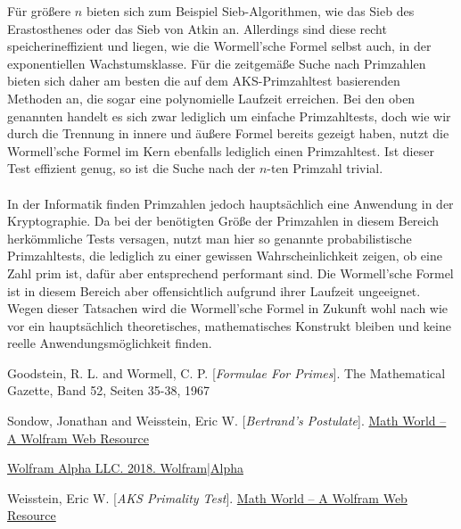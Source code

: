 \documentclass[11pt]{scrartcl}
\begin{document}
Für größere $n$ bieten sich zum Beispiel Sieb-Algorithmen, wie das Sieb des Erastosthenes oder das Sieb von Atkin an. Allerdings sind diese recht speicherineffizient und liegen, wie die Wormell'sche Formel selbst auch, in der exponentiellen Wachstumsklasse. Für die zeitgemäße Suche nach Primzahlen bieten sich daher am besten die auf dem AKS-Primzahltest\cite{AKS-Primzahltest} basierenden Methoden an, die sogar eine polynomielle Laufzeit erreichen. Bei den oben genannten handelt es sich zwar lediglich um einfache Primzahltests, doch wie wir durch die Trennung in innere und äußere Formel bereits gezeigt haben, nutzt die Wormell'sche Formel im Kern ebenfalls lediglich einen Primzahltest. Ist dieser Test effizient genug, so ist die Suche nach der $n$-ten Primzahl trivial.

\paragraph{}

In der Informatik finden Primzahlen jedoch hauptsächlich eine Anwendung in der Kryptographie. Da bei der benötigten Größe der Primzahlen in diesem Bereich herkömmliche Tests versagen, nutzt man hier so genannte probabilistische Primzahltests, die lediglich zu einer gewissen Wahrscheinlichkeit zeigen, ob eine Zahl prim ist, dafür aber entsprechend performant sind. Die Wormell'sche Formel ist in diesem Bereich aber offensichtlich aufgrund ihrer Laufzeit ungeeignet. Wegen dieser Tatsachen wird die Wormell'sche Formel in Zukunft wohl nach wie vor ein hauptsächlich theoretisches, mathematisches Konstrukt bleiben und keine reelle Anwendungsmöglichkeit finden.

\begin{thebibliography}{9}

Goodstein, R. L. and Wormell, C. P.
[\textit{Formulae For Primes}]. 
The Mathematical Gazette, Band 52, Seiten 35-38, 1967

Sondow, Jonathan and Weisstein, Eric W.
[\textit{Bertrand's Postulate}]. 
 \href{http://mathworld.wolfram.com/BertrandsPostulate.html}{Math World -- A Wolfram Web Resource}

\href{http://www.wolframalpha.com/input/?i=prime+1+to+100000}{Wolfram Alpha LLC. 2018. Wolfram|Alpha}

Weisstein, Eric W.
[\textit{AKS Primality Test}]. 
\href{http://mathworld.wolfram.com/AKSPrimalityTest.html}{Math World -- A Wolfram Web Resource}

\end{thebibliography}
\end{document}
